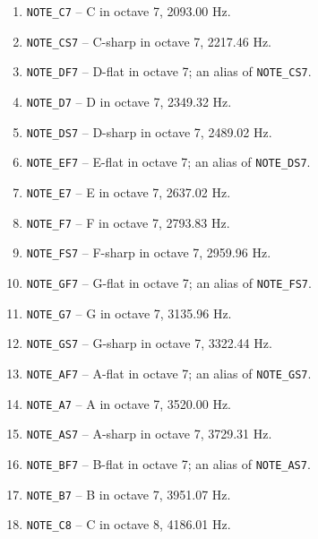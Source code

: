 \begin{enumerate}
    \item \texttt{NOTE\_C7} -- C in octave 7, 2093.00 Hz.
    \item \texttt{NOTE\_CS7} -- C-sharp in octave 7, 2217.46 Hz.
    \item \texttt{NOTE\_DF7} -- D-flat in octave 7; an alias of \texttt{NOTE\_CS7}.
    \item \texttt{NOTE\_D7} -- D in octave 7, 2349.32 Hz.
    \item \texttt{NOTE\_DS7} -- D-sharp in octave 7, 2489.02 Hz.
    \item \texttt{NOTE\_EF7} -- E-flat in octave 7; an alias of \texttt{NOTE\_DS7}.
    \item \texttt{NOTE\_E7} -- E in octave 7, 2637.02 Hz.
    \item \texttt{NOTE\_F7} -- F in octave 7, 2793.83 Hz.
    \item \texttt{NOTE\_FS7} -- F-sharp in octave 7, 2959.96 Hz.
    \item \texttt{NOTE\_GF7} -- G-flat in octave 7; an alias of \texttt{NOTE\_FS7}.
    \item \texttt{NOTE\_G7} -- G in octave 7, 3135.96 Hz.
    \item \texttt{NOTE\_GS7} -- G-sharp in octave 7, 3322.44 Hz.
    \item \texttt{NOTE\_AF7} -- A-flat in octave 7; an alias of \texttt{NOTE\_GS7}.
    \item \texttt{NOTE\_A7} -- A in octave 7, 3520.00 Hz.
    \item \texttt{NOTE\_AS7} -- A-sharp in octave 7, 3729.31 Hz.
    \item \texttt{NOTE\_BF7} -- B-flat in octave 7; an alias of \texttt{NOTE\_AS7}.
    \item \texttt{NOTE\_B7} -- B in octave 7, 3951.07 Hz.

    \item \texttt{NOTE\_C8} -- C in octave 8, 4186.01 Hz.
\end{enumerate}
